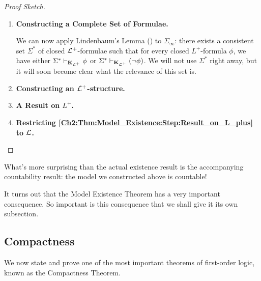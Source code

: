 \begin{proof}[Proof Sketch]
\begin{enumerate}[label = \underline{\textbf{Step \arabic*.}}]
        \item \textbf{Constructing a Complete Set of Formulae.}
        
        We can now apply Lindenbaum's Lemma () to $\Sigma_{\infty}$: there exists a consistent set $\Sigma^*$ of closed $\mathcal{L}^+$-formulae such that for every closed $L^+$-formula $\phi$, we have either $\Sigma^* \vdash_{\mathbf{K}_{\mathcal{L}^+}} \phi$ or $\Sigma^* \vdash_{\mathbf{K}_{\mathcal{L}^+}} \left( \neg \phi \right)$. We will not use $\Sigma^*$ right away, but it will soon become clear what the relevance of this set is.
        
        \item \textbf{Constructing an $\mathcal{L}^+$-structure.}
        
        \sorry
        
        \item\label{Ch2:Thm:Model_Existence:Step:Result_on_L_plus} \textbf{A Result on $L^+$.}
        
        \sorry

        \item \textbf{Restricting \ref{Ch2:Thm:Model_Existence:Step:Result_on_L_plus} to $\mathcal{L}$.}
        
        \sorry
    \end{enumerate}
\end{proof}

What's more surprising than the actual existence result is the accompanying countability result: the model we constructed above is countable!

It turns out that the Model Existence Theorem has a very important consequence. So important is this consequence that we shall give it its own subsection.

\subsection{Compactness}

We now state and prove one of the most important theorems of first-order logic, known as the Compactness Theorem.

